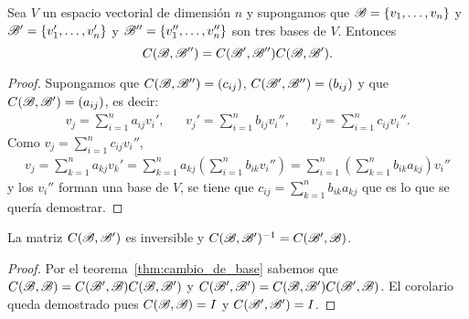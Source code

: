 \begin{thm}
	\label{thm:cambio_de_base}
	Sea $V$ un espacio vectorial de dimensión $n$ y supongamos que
	$\mathscr{B}=\{v_1,\dots,v_n\}$ y $\mathscr{B}'=\{v_1',\dots,v_n'\}$ y
	$\mathscr{B}''=\{v_1'',\dots,v_n''\}$ son tres bases de $V$. Entonces
	\[
		C(\mathscr{B},\mathscr{B}'')=C(\mathscr{B}',\mathscr{B}'')C(\mathscr{B},\mathscr{B}').
	\]

	\begin{proof}
		Supongamos que $C(\mathscr{B},\mathscr{B}'')=(c_{ij})$, $C(\mathscr{B}',\mathscr{B}'')=(b_{ij})$ y que
		$C(\mathscr{B},\mathscr{B}')=(a_{ij})$, es decir:
		\begin{align*}
			v_j=\sum_{i=1}^na_{ij}v_i',
			&&
			v_j'=\sum_{i=1}^n b_{ij}v_i'',
			&&
			v_j=\sum_{i=1}^nc_{ij}v_i''.
		\end{align*}
		Como $v_j=\sum_{i=1}^nc_{ij}v_i''$, 
		\begin{align*}
			v_j = \sum_{k=1}^n a_{kj}v_k'
			=\sum_{k=1}^n a_{kj}\left(\sum_{i=1}^n b_{ik}v_i''\right)
			=\sum_{i=1}^n\left(\sum_{k=1}^n b_{ik}a_{kj}\right)v_i''
		\end{align*}
		y los $v_i''$ forman una base de $V$, se tiene que $c_{ij}=\sum_{k=1}^n
		b_{ik}a_{kj}$ que es lo que se quería demostrar.
	\end{proof}
\end{thm}

\begin{cor}
	\label{cor:C_inversible}
	La matriz $C(\mathscr{B},\mathscr{B}')$ es inversible y $C(\mathscr{B},\mathscr{B}')^{-1}=C(\mathscr{B}',\mathscr{B})$. 

	\begin{proof}
		Por el teorema~\ref{thm:cambio_de_base} sabemos que $C(\mathscr{B},\mathscr{B})=C(\mathscr{B}',\mathscr{B})C(\mathscr{B},\mathscr{B}')$ y 
		$C(\mathscr{B}',\mathscr{B}')=C(\mathscr{B},\mathscr{B}')C(\mathscr{B}',\mathscr{B})$. El corolario queda demostrado pues $C(\mathscr{B},\mathscr{B})=I$ y
		$C(\mathscr{B}',\mathscr{B}')=I$.
	\end{proof}
\end{cor}


